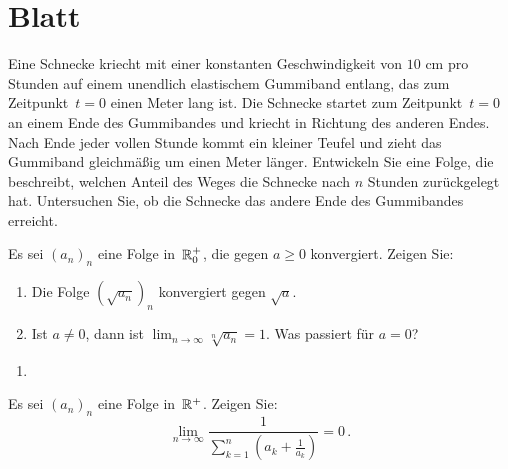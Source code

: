 \section{Blatt}

\begin{aufg}[6 Punkte] 
Eine Schnecke kriecht mit einer konstanten Geschwindigkeit von $10$ cm pro Stunden auf einem unendlich elastischem Gummiband entlang, das zum Zeitpunkt~$t=0$ einen Meter lang ist. Die Schnecke startet zum Zeitpunkt~$t=0$ an einem Ende des Gummibandes und kriecht in Richtung des anderen Endes. Nach Ende jeder vollen Stunde kommt ein kleiner Teufel und zieht das Gummiband gleichm\"a{\ss}ig um einen Meter l\"anger. Entwickeln Sie eine Folge, die beschreibt, welchen Anteil des Weges die Schnecke nach $n$ Stunden zur\"uckgelegt hat. Untersuchen Sie, ob die Schnecke das andere Ende des Gummibandes erreicht.
\end{aufg}

\bigskip

\begin{lsg}
\end{lsg}

\bigskip

\begin{aufg}[6 Punkte]
Es sei $(a_n)_n$ eine Folge in~$\mathbb{R}^+_0$, die gegen $a\geq 0$ konvergiert. Zeigen  Sie:
\begin{enumerate}[label=$\mathrm{(\roman*)}$, ref=$\mathrm{\roman*}$]
 \item Die Folge $(\sqrt{a_n})_n$ konvergiert gegen $\sqrt{a}$.
 \item Ist $a\not=0$, dann ist $\lim_{n\to\infty} \sqrt[n]{a_n} = 1$. Was passiert f\"ur $a=0$?
\end{enumerate}
\end{aufg}
 
\bigskip

\begin{lsg}
\begin{enumerate}[label=$\mathrm{(\roman*)}$, ref=$\mathrm{\roman*}$]
\item 
\end{enumerate}
\end{lsg}


\bigskip


\begin{aufg}[6 Punkte]
Es sei $(a_n)_n$ eine Folge in~$\mathbb{R}^+$. Zeigen Sie:
\[
 \lim_{n\to\infty} \frac{1}{\sum_{k=1}^n (a_k + \frac{1}{a_k})} = 0\,.
\]
\end{aufg}


